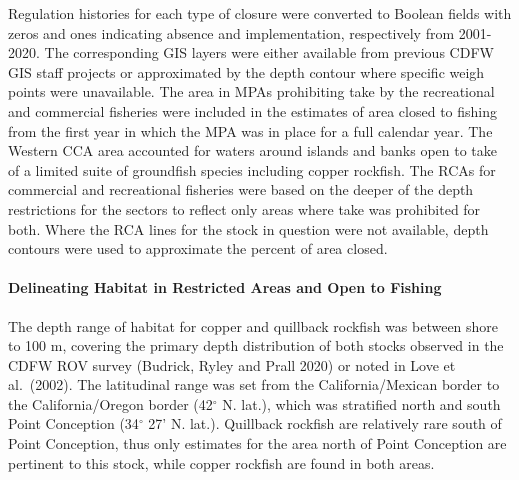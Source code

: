 \documentclass[11pt,
  english,
  a4paper,
]{article}
\begin{document}

Regulation histories for each type of closure were converted to Boolean fields with zeros and ones indicating absence and implementation, respectively from 2001-2020. The corresponding GIS layers were either available from previous CDFW GIS staff projects or approximated by the depth contour where specific weigh points were unavailable. The area in MPAs prohibiting take by the recreational and commercial fisheries were included in the estimates of area closed to fishing from the first year in which the MPA was in place for a full calendar year. The Western CCA area accounted for waters around islands and banks open to take of a limited suite of groundfish species including copper rockfish. The RCAs for commercial and recreational fisheries were based on the deeper of the depth restrictions for the sectors to reflect only areas where take was prohibited for both. Where the RCA lines for the stock in question were not available, depth contours were used to approximate the percent of area closed.

\leavevmode\tagmcend\tagstructend\par


\hypertarget{delineating-habitat-in-restricted-areas-and-open-to-fishing}{%
\paragraph{Delineating Habitat in Restricted Areas and Open to Fishing}\label{delineating-habitat-in-restricted-areas-and-open-to-fishing}}

\leavevmode\tagmcend\tagstructend


The depth range of habitat for copper and quillback rockfish was between shore to 100 m, covering the primary depth distribution of both stocks observed in the CDFW ROV survey (Budrick, Ryley and Prall 2020) or noted in Love et al.~(2002). The latitudinal range was set from the California/Mexican border to the California/Oregon border (42{\(^\circ\)\leavevmode\tagmcend\tagstructend} N. lat.), which was stratified north and south Point Conception (34{\(^\circ\)\leavevmode\tagmcend\tagstructend} 27' N. lat.). Quillback rockfish are relatively rare south of Point Conception, thus only estimates for the area north of Point Conception are pertinent to this stock, while copper rockfish are found in both areas.
\end{document}
